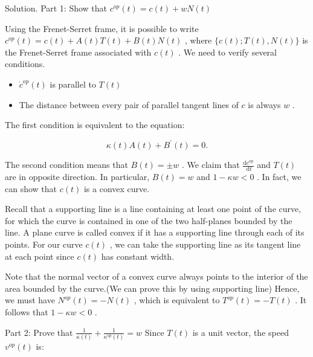 \documentclass[10pt]{article}
\begin{document}
Solution. Part 1: Show that \({c}^{op}\left( t\right)  = c\left( t\right)  + {wN}\left( t\right)\)

Using the Frenet-Serret frame, it is possible to write \({c}^{op}\left( t\right)  = c\left( t\right)  + A\left( t\right) T\left( t\right)  + B\left( t\right) N\left( t\right)\) , where \(\{ c\left( t\right) ;T\left( t\right) ,N\left( t\right) \}\) is the Frenet-Serret frame associated with \(c\left( t\right)\) . We need to verify several conditions.

\begin{itemize}\relax
\item\relax \({\dot{c}}^{op}\left( t\right)\) is parallel to \(T\left( t\right)\)
\end{itemize}

\begin{itemize}\relax
\item\relax The distance between every pair of parallel tangent lines of \(c\) is always \(w\) .
\end{itemize}

The first condition is equivalent to the equation:

\[
\kappa \left( t\right) A\left( t\right)  + {B}^{\prime }\left( t\right)  = 0.
\]

The second condition means that \(B\left( t\right)  =  \pm  w\) . We claim that \(\frac{\mathrm{d}{c}^{op}}{\mathrm{\;d}t}\) and \(T\left( t\right)\) are in opposite direction. In particular, \(B\left( t\right)  = w\) and \(1 - {\kappa w} < 0\) . In fact, we can show that \(c\left( t\right)\) is a convex curve.

Recall that a supporting line is a line containing at least one point of the curve, for which the curve is contained in one of the two half-planes bounded by the line. A plane curve is called convex if it has a supporting line through each of its points. For our curve \(c\left( t\right)\) , we can take the supporting line as its tangent line at each point since \(c\left( t\right)\) has constant width.

Note that the normal vector of a convex curve always points to the interior of the area bounded by the curve.(We can prove this by using supporting line) Hence, we must have \({N}^{op}\left( t\right)  =  - N\left( t\right)\) , which is equivalent to \({T}^{op}\left( t\right)  =  - T\left( t\right)\) . It follows that \(1 - {\kappa w} < 0\) .

Part 2: Prove that \(\frac{1}{\kappa \left( t\right) } + \frac{1}{{\kappa }^{op}\left( t\right) } = w\) Since \(T\left( t\right)\) is a unit vector, the speed \({v}^{op}\left( t\right)\) is:
\end{document}
